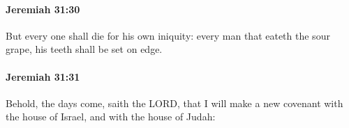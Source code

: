 		\paragraph{Jeremiah 31:30} %
			\label{JEREMIAH-31-30}

			But every one shall die for his own iniquity: every man that eateth the sour grape, his teeth shall be set on edge.


		\paragraph{Jeremiah 31:31} %
			\label{JEREMIAH-31-31}

			Behold, the days come, saith the LORD, that I will make a new covenant with the house of Israel, and with the house of Judah:


